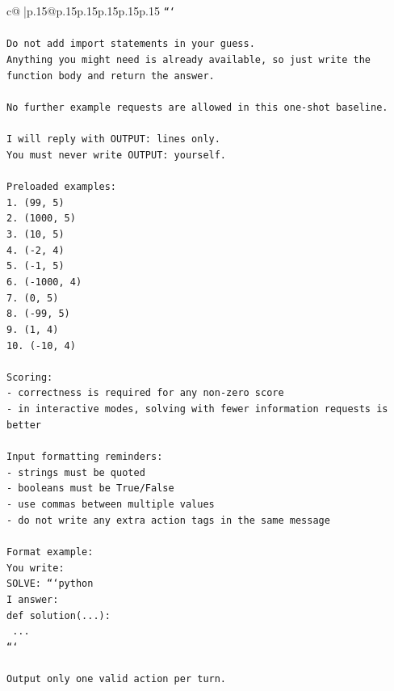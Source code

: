 \documentclass{article}
\begin{document}
{\begin{supertabular}{c@{$\;$}|p{.15\linewidth}@{}p{.15\linewidth}p{.15\linewidth}p{.15\linewidth}p{.15\linewidth}p{.15\linewidth}}
{{{\texttt{```} \\
\\ 
\texttt{Do not add import statements in your guess.} \\
\texttt{Anything you might need is already available, so just write the function body and return the answer.} \\
\\ 
\texttt{No further example requests are allowed in this one{-}shot baseline.} \\
\\ 
\texttt{I will reply with OUTPUT: lines only.} \\
\texttt{You must never write OUTPUT: yourself.} \\
\\ 
\texttt{Preloaded examples:} \\
\texttt{1. (99, 5)} \\
\texttt{2. (1000, 5)} \\
\texttt{3. (10, 5)} \\
\texttt{4. ({-}2, 4)} \\
\texttt{5. ({-}1, 5)} \\
\texttt{6. ({-}1000, 4)} \\
\texttt{7. (0, 5)} \\
\texttt{8. ({-}99, 5)} \\
\texttt{9. (1, 4)} \\
\texttt{10. ({-}10, 4)} \\
\\ 
\texttt{Scoring:} \\
\texttt{{-} correctness is required for any non{-}zero score} \\
\texttt{{-} in interactive modes, solving with fewer information requests is better} \\
\\ 
\texttt{Input formatting reminders:} \\
\texttt{{-} strings must be quoted} \\
\texttt{{-} booleans must be True/False} \\
\texttt{{-} use commas between multiple values} \\
\texttt{{-} do not write any extra action tags in the same message} \\
\\ 
\texttt{Format example:} \\
\texttt{You write:} \\
\texttt{SOLVE: ```python} \\
\texttt{I answer:} \\
\texttt{def solution(...):} \\
\texttt{    ...} \\
\texttt{```} \\
\\ 
\texttt{Output only one valid action per turn.} \\
            }
        }
    }
     \\ \\


\end{supertabular}}
\end{document}
